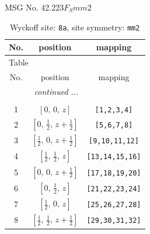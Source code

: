 \documentclass[fleqn,8pt]{jsarticle}
\begin{document}
\setcounter{MaxMatrixCols}{32}

\renewcommand{\tablename}{Table~}
\renewcommand{\figurename}{Figure~}
\begin{center}
\LARGE
MSG No. 42.223\quad$F_{S}mm2$
\end{center}
\renewcommand{\arraystretch}{1.2}
\begin{longtable}{ccc}
\caption{Wyckoff site: {\tt 8a}, site symmetry: {\tt mm2}}
 \\
 \hline \hline
No. & position & mapping \\ \hline \endfirsthead

\multicolumn{2}{l}{\tablename\ \thetable{}} \\
 \hline \hline
No. & position & mapping \\ \hline \endhead

 \hline \hline
\multicolumn{2}{r}{\footnotesize\it continued ...} \\ \endfoot

 \hline \hline
\multicolumn{2}{r}{} \\ \endlastfoot

1 & $\left[ 0,\, 0,\, z \right]$ & {\tt [1,2,3,4]} \\ \hline
2 & $\left[ 0,\, \frac{1}{2},\, z + \frac{1}{2} \right]$ & {\tt [5,6,7,8]} \\ \hline
3 & $\left[ \frac{1}{2},\, 0,\, z + \frac{1}{2} \right]$ & {\tt [9,10,11,12]} \\ \hline
4 & $\left[ \frac{1}{2},\, \frac{1}{2},\, z \right]$ & {\tt [13,14,15,16]} \\ \hline
5 & $\left[ 0,\, 0,\, z + \frac{1}{2} \right]$ & {\tt [17,18,19,20]} \\ \hline
6 & $\left[ 0,\, \frac{1}{2},\, z \right]$ & {\tt [21,22,23,24]} \\ \hline
7 & $\left[ \frac{1}{2},\, 0,\, z \right]$ & {\tt [25,26,27,28]} \\ \hline
8 & $\left[ \frac{1}{2},\, \frac{1}{2},\, z + \frac{1}{2} \right]$ & {\tt [29,30,31,32]} \\
\end{longtable}
\renewcommand{\arraystretch}{1.2}
\end{document}

